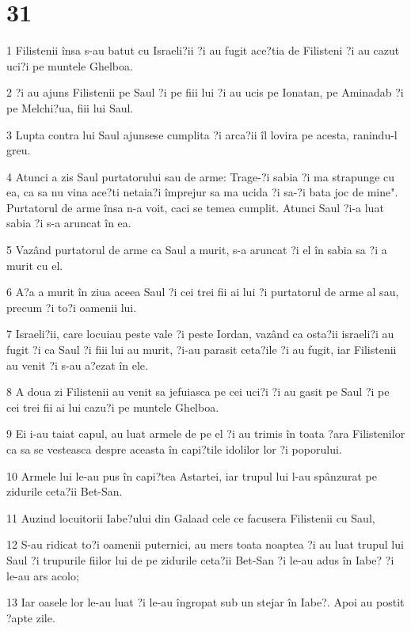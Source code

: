 \chapter{31}

\par 1 Filistenii însa s-au batut cu Israeli?ii ?i au fugit ace?tia de Filisteni ?i au cazut uci?i pe muntele Ghelboa.
\par 2 ?i au ajuns Filistenii pe Saul ?i pe fiii lui ?i au ucis pe Ionatan, pe Aminadab ?i pe Melchi?ua, fiii lui Saul.
\par 3 Lupta contra lui Saul ajunsese cumplita ?i arca?ii îl lovira pe acesta, ranindu-l greu.
\par 4 Atunci a zis Saul purtatorului sau de arme: Trage-?i sabia ?i ma strapunge cu ea, ca sa nu vina ace?ti netaia?i împrejur sa ma ucida ?i sa-?i bata joc de mine". Purtatorul de arme însa n-a voit, caci se temea cumplit. Atunci Saul ?i-a luat sabia ?i s-a aruncat în ea.
\par 5 Vazând purtatorul de arme ca Saul a murit, s-a aruncat ?i el în sabia sa ?i a murit cu el.
\par 6 A?a a murit în ziua aceea Saul ?i cei trei fii ai lui ?i purtatorul de arme al sau, precum ?i to?i oamenii lui.
\par 7 Israeli?ii, care locuiau peste vale ?i peste Iordan, vazând ca osta?ii israeli?i au fugit ?i ca Saul ?i fiii lui au murit, ?i-au parasit ceta?ile ?i au fugit, iar Filistenii au venit ?i s-au a?ezat în ele.
\par 8 A doua zi Filistenii au venit sa jefuiasca pe cei uci?i ?i au gasit pe Saul ?i pe cei trei fii ai lui cazu?i pe muntele Ghelboa.
\par 9 Ei i-au taiat capul, au luat armele de pe el ?i au trimis în toata ?ara Filistenilor ca sa se vesteasca despre aceasta în capi?tile idolilor lor ?i poporului.
\par 10 Armele lui le-au pus în capi?tea Astartei, iar trupul lui l-au spânzurat pe zidurile ceta?ii Bet-San.
\par 11 Auzind locuitorii Iabe?ului din Galaad cele ce facusera Filistenii cu Saul,
\par 12 S-au ridicat to?i oamenii puternici, au mers toata noaptea ?i au luat trupul lui Saul ?i trupurile fiilor lui de pe zidurile ceta?ii Bet-San ?i le-au adus în Iabe? ?i le-au ars acolo;
\par 13 Iar oasele lor le-au luat ?i le-au îngropat sub un stejar în Iabe?. Apoi au postit ?apte zile.


